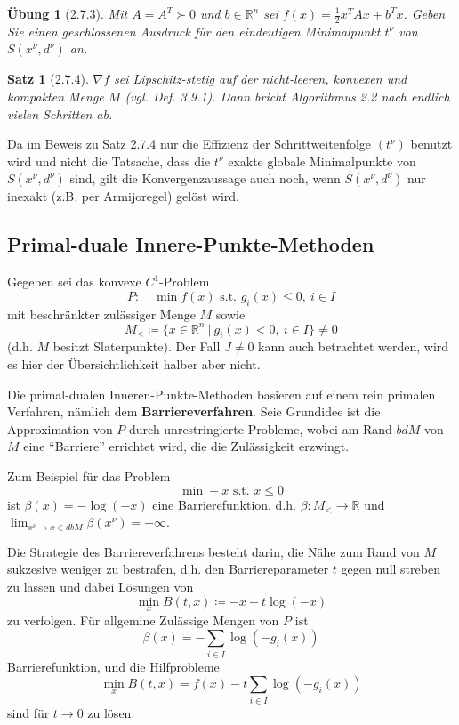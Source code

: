 \documentclass[12pt]{extreport} %
\newcommand{\R}{\mathbb{R}}
\theoremstyle{named}
\theoremstyle{nnamed}
\theoremstyle{itshape}
\newtheorem*{satz}{Satz}
\theoremstyle{normal}
\newtheorem*{uebung}{Übung}
\begin{document}
\begin{uebung}[2.7.3]
	Mit $A = A^T \succ 0$ und $b \in \R^n$ sei $f(x) = \frac{1}{2} x^T A x + b^T x$. Geben Sie einen geschlossenen Ausdruck für den eindeutigen Minimalpunkt $t^\nu$ von $S(x^\nu, d^\nu)$ an.
\end{uebung} %

\begin{satz}[2.7.4]
	$\nabla f$ sei Lipschitz-stetig auf der nicht-leeren, konvexen und kompakten Menge $M$ (vgl. Def. 3.9.1). Dann bricht Algorithmus 2.2 nach endlich vielen Schritten ab.
\end{satz}

Da im Beweis zu Satz 2.7.4 nur die Effizienz der Schrittweitenfolge $(t^\nu)$ benutzt wird und nicht die Tatsache, dass die $t^\nu$ exakte globale Minimalpunkte von $S(x^\nu, d^\nu)$ sind, gilt die Konvergenzaussage auch noch, wenn $S(x^\nu, d^\nu)$ nur inexakt (z.B. per Armijoregel) gelöst wird. %

\subsection*{Primal-duale Innere-Punkte-Methoden}

Gegeben sei das konvexe $C^1$-Problem
	$$ P: \quad \min f(x) \text{ s.t. } g_i(x) \leq 0, ~ i \in I $$
mit beschränkter zulässiger Menge $M$ sowie
	$$ M_< \coloneqq \big\{ x \in \R^n ~|~g_i(x) < 0, ~ i \in I \big\} \neq 0 $$
(d.h. $M$ besitzt Slaterpunkte). Der Fall $J \neq 0$ kann auch betrachtet werden, wird es hier der Übersichtlichkeit halber aber nicht. ~\bigskip

Die primal-dualen Inneren-Punkte-Methoden basieren auf einem rein primalen Verfahren, nämlich dem \textbf{Barriereverfahren}. Seie Grundidee ist die Approximation von $P$ durch unrestringierte Probleme, wobei am Rand $bd M$ von $M$ eine \enquote{Barriere} errichtet wird, die die Zulässigkeit erzwingt. ~\bigskip

Zum Beispiel für das Problem 
	$$ \min -x \text{ s.t. } x \leq 0 $$
	ist $\beta(x) = -\log(-x)$ eine Barrierefunktion, d.h. $\beta \colon M_< \rightarrow \R$ und $\lim_{x^\nu \rightarrow x \in dbM} \beta(x^\nu) = + \infty$. ~\bigskip
	
Die Strategie des Barriereverfahrens besteht darin, die Nähe zum Rand von $M$ sukzesive weniger zu bestrafen, d.h. den Barriereparameter $t$ gegen null streben zu lassen und dabei Lösungen von
$$ \min_x B(t, x) \coloneqq -x -t\log(-x) $$
zu verfolgen. Für allgemine Zulässige Mengen von $P$ ist
$$ \beta(x) = -\sum_{i \in I} \log( -g_i(x)) $$
Barrierefunktion, und die Hilfprobleme 
$$ \min_x B(t, x) = f(x) - t\sum_{i \in I} \log(-g_i(x)) $$
sind für $t \rightarrow 0$ zu lösen.
\end{document}
